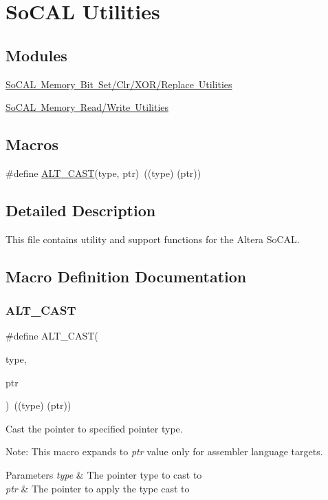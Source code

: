 \hypertarget{group__ALT__SOCAL__UTIL}{}\section{So\+C\+AL Utilities}
\label{group__ALT__SOCAL__UTIL}
\subsection*{Modules}
\begin{DoxyCompactItemize}
\item 
\mbox{\hyperlink{group__ALT__SOCAL__UTIL__SC__FUNC}{So\+C\+A\+L Memory Bit Set/\+Clr/\+X\+O\+R/\+Replace Utilities}}
\item 
\mbox{\hyperlink{group__ALT__SOCAL__UTIL__RW__FUNC}{So\+C\+A\+L Memory Read/\+Write Utilities}}
\end{DoxyCompactItemize}
\subsection*{Macros}
\begin{DoxyCompactItemize}
\item 
\#define \mbox{\hyperlink{group__ALT__SOCAL__UTIL_ga0c0d803769fc22ce2c319fc475febbde}{A\+L\+T\+\_\+\+C\+A\+ST}}(type,  ptr)~((type) (ptr))
\end{DoxyCompactItemize}


\subsection{Detailed Description}
This file contains utility and support functions for the Altera So\+C\+AL. 

\subsection{Macro Definition Documentation}
\mbox{\label{group__ALT__SOCAL__UTIL_ga0c0d803769fc22ce2c319fc475febbde}} 
\subsubsection{\texorpdfstring{ALT\_CAST}{ALT\_CAST}}
{\footnotesize\ttfamily \#define A\+L\+T\+\_\+\+C\+A\+ST(\begin{DoxyParamCaption}\item[{}]{type,  }\item[{}]{ptr }\end{DoxyParamCaption})~((type) (ptr))}

Cast the pointer to specified pointer type.

Note\+: This macro expands to {\itshape ptr} value only for assembler language targets.


\begin{DoxyParams}{Parameters}
{\em type} & The pointer type to cast to \\
\hline
{\em ptr} & The pointer to apply the type cast to \\
\hline
\end{DoxyParams}
